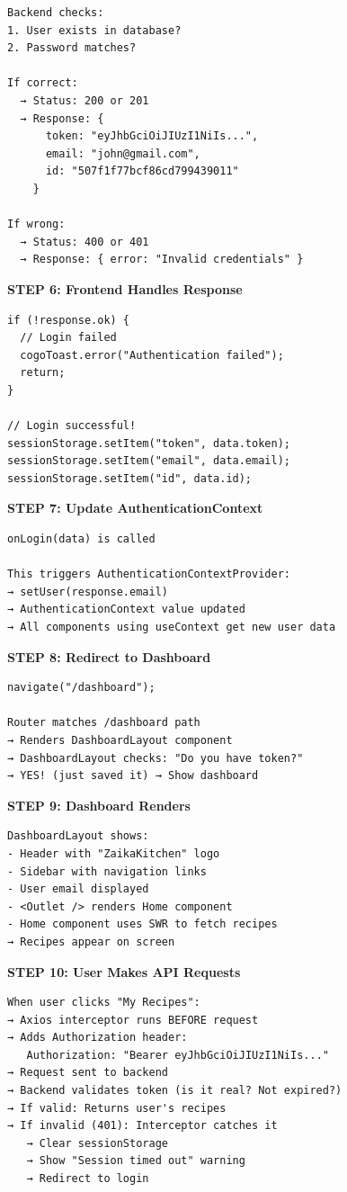 \documentclass[12pt]{article}
\begin{document}
\begin{lstlisting}
Backend checks:
1. User exists in database?
2. Password matches?

If correct:
  → Status: 200 or 201
  → Response: {
      token: "eyJhbGciOiJIUzI1NiIs...",
      email: "john@gmail.com",
      id: "507f1f77bcf86cd799439011"
    }

If wrong:
  → Status: 400 or 401
  → Response: { error: "Invalid credentials" }
\end{lstlisting}

\textbf{STEP 6: Frontend Handles Response}

\begin{lstlisting}
if (!response.ok) {
  // Login failed
  cogoToast.error("Authentication failed");
  return;
}

// Login successful!
sessionStorage.setItem("token", data.token);
sessionStorage.setItem("email", data.email);
sessionStorage.setItem("id", data.id);
\end{lstlisting}

\textbf{STEP 7: Update AuthenticationContext}

\begin{lstlisting}
onLogin(data) is called

This triggers AuthenticationContextProvider:
→ setUser(response.email)
→ AuthenticationContext value updated
→ All components using useContext get new user data
\end{lstlisting}

\textbf{STEP 8: Redirect to Dashboard}

\begin{lstlisting}
navigate("/dashboard");

Router matches /dashboard path
→ Renders DashboardLayout component
→ DashboardLayout checks: "Do you have token?"
→ YES! (just saved it) → Show dashboard
\end{lstlisting}

\textbf{STEP 9: Dashboard Renders}

\begin{lstlisting}
DashboardLayout shows:
- Header with "ZaikaKitchen" logo
- Sidebar with navigation links
- User email displayed
- <Outlet /> renders Home component
- Home component uses SWR to fetch recipes
→ Recipes appear on screen
\end{lstlisting}

\textbf{STEP 10: User Makes API Requests}

\begin{lstlisting}
When user clicks "My Recipes":
→ Axios interceptor runs BEFORE request
→ Adds Authorization header:
   Authorization: "Bearer eyJhbGciOiJIUzI1NiIs..."
→ Request sent to backend
→ Backend validates token (is it real? Not expired?)
→ If valid: Returns user's recipes
→ If invalid (401): Interceptor catches it
   → Clear sessionStorage
   → Show "Session timed out" warning
   → Redirect to login
\end{lstlisting}
\end{document}
